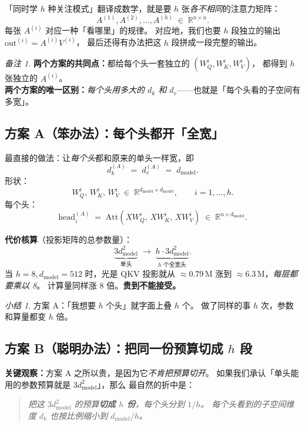 \documentclass[11pt,a4paper]{ctexart}
\theoremstyle{definition}
\theoremstyle{remark}
\newtheorem*{remarkx}{备注}
\newtheorem*{summary}{小结}
\newcommand{\R}{\mathbb{R}}
\newcommand{\Att}{\mathrm{Att}}
\begin{document}
「同时学 $h$ 种关注模式」翻译成数学，就是要 $h$ 张\emph{各不相同}的注意力矩阵：
\[
  A^{(1)}, A^{(2)}, \dots, A^{(h)} \;\in\; \R^{n \times n}.
\]
每张 $A^{(i)}$ 对应一种「看哪里」的规律。
对应地，我们也要 $h$ 段独立的输出
$\mathrm{out}^{(i)} = A^{(i)} V^{(i)}$，
最后还得有办法把这 $h$ 段拼成一段完整的输出。

\begin{remarkx}
\textbf{两个方案的共同点：}都给每个头一套独立的 $(W_Q^i, W_K^i, W_V^i)$，
都得到 $h$ 张独立的 $A^{(i)}$。\\
\textbf{两个方案的唯一区别：}\emph{每个头用多大的 $d_k$ 和 $d_v$}——也就是「每个头看的子空间有多宽」。
\end{remarkx}

\subsection{方案 A（笨办法）：每个头都开「全宽」}

最直接的做法：让\emph{每个头}都和原来的单头一样宽，即
\[
  d_k^{(A)} \;=\; d_v^{(A)} \;=\; d_{\text{model}}.
\]
形状：
\[
  W_Q^i,\, W_K^i,\, W_V^i \;\in\; \R^{d_{\text{model}} \times d_{\text{model}}}, \qquad i = 1, \dots, h.
\]
每个头：
\[
  \mathrm{head}_i^{(A)} \;=\; \Att(X W_Q^i,\, X W_K^i,\, X W_V^i)
  \;\in\; \R^{n \times d_{\text{model}}}.
\]

\textbf{代价核算}（投影矩阵的总参数量）：
\[
  \underbrace{3 d_{\text{model}}^2}_{\text{单头}} \;\to\;
  \underbrace{h \cdot 3 d_{\text{model}}^2}_{\text{$h$ 个全宽头}}.
\]
当 $h = 8, d_{\text{model}} = 512$ 时，光是 QKV 投影就从 $\approx 0.79\,$M 涨到 $\approx 6.3\,$M，\emph{每层都要乘以 8}。
计算量同样涨 $8$ 倍。\textbf{贵到不能接受。}

\begin{summary}
方案 A：「我想要 $h$ 个头」就字面上叠 $h$ 个。
做了同样的事 $h$ 次，参数和算量都变 $h$ 倍。
\end{summary}

\subsection{方案 B（聪明办法）：把同一份预算切成 \texorpdfstring{$h$}{h} 段}

\textbf{关键观察：}方案 A 之所以贵，是因为它\emph{不肯把预算切开}。
如果我们承认「单头能用的参数预算就是 $3 d_{\text{model}}^2$」，那么
最自然的折中是：

\begin{quote}
\emph{把这 $3 d_{\text{model}}^2$ 的预算\textbf{切成 $h$ 份}，每个头分到 $1/h$。
每个头看到的子空间维度 $d_k$ 也按比例缩小到 $d_{\text{model}}/h$。}
\end{quote}
\end{document}
